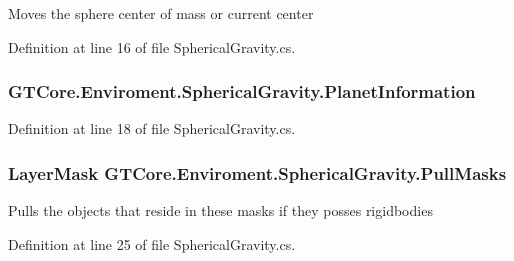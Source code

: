 Moves the sphere center of mass or current center 



Definition at line 16 of file Spherical\+Gravity.\+cs.

\hypertarget{class_g_t_core_1_1_enviroment_1_1_spherical_gravity_a1c82b6d71183bcaa8960cc83fb25912c}{}
\subsubsection[{Planet\+Information}]{ G\+T\+Core.\+Enviroment.\+Spherical\+Gravity.\+Planet\+Information}\label{class_g_t_core_1_1_enviroment_1_1_spherical_gravity_a1c82b6d71183bcaa8960cc83fb25912c}


Definition at line 18 of file Spherical\+Gravity.\+cs.

\hypertarget{class_g_t_core_1_1_enviroment_1_1_spherical_gravity_adc8b38ae5977a128be64af2f272f225c}{}
\subsubsection[{Pull\+Masks}]{\setlength{\rightskip}{0pt plus 5cm}Layer\+Mask G\+T\+Core.\+Enviroment.\+Spherical\+Gravity.\+Pull\+Masks}\label{class_g_t_core_1_1_enviroment_1_1_spherical_gravity_adc8b38ae5977a128be64af2f272f225c}


Pulls the objects that reside in these masks if they posses rigidbodies 



Definition at line 25 of file Spherical\+Gravity.\+cs.

\hypertarget{class_g_t_core_1_1_enviroment_1_1_spherical_gravity_a503f1cdc6032d4bd7393fbed67af90b8}{}
